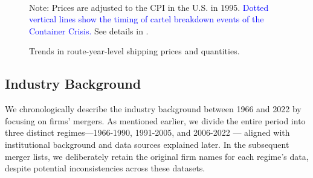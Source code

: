 \documentclass[10pt]{article}
\begin{document}
\begin{figure}[!ht]
\begin{center}
  \\
  \caption{Trends in route-year-level shipping prices and quantities.}
  \label{fg:container_freight_rate_and_shipping_quantity_each_route}
  \end{center}
\footnotesize
  Note: Prices are adjusted to the CPI in the U.S. in 1995. \textcolor{blue}{Dotted vertical lines show the timing of cartel breakdown events of the Container Crisis.} See details in \cite{matsuda2022unified}.
\end{figure}

\subsection{Industry Background}\label{sec:industry_background}
We chronologically describe the industry background between 1966 and 2022  by focusing on firms' mergers. 
As mentioned earlier, we divide the entire period into three distinct regimes—1966-1990, 1991-2005, and 2006-2022 — aligned with institutional background and data sources explained later.
In the subsequent merger lists, we deliberately retain the original firm names for each regime's data, despite potential inconsistencies across these datasets.
\end{document}
